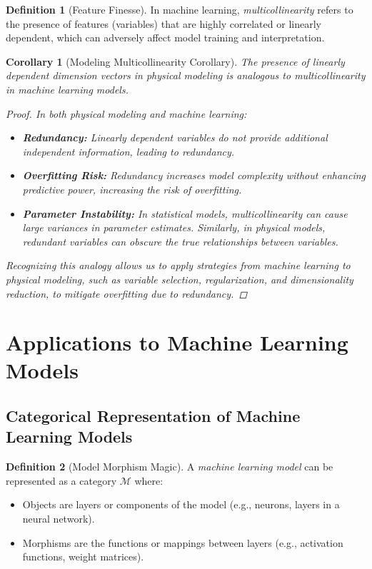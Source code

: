 \documentclass{article}
\newtheorem{corollary}{Corollary}[theorem]
\theoremstyle{definition}
\newtheorem{definition}{Definition}[section]
\theoremstyle{remark}
\begin{document}
	\begin{definition}[Feature Finesse]
		In machine learning, \emph{multicollinearity} refers to the presence of features (variables) that are highly correlated or linearly dependent, which can adversely affect model training and interpretation.
	\end{definition}
	
	\begin{corollary}[Modeling Multicollinearity Corollary]
		The presence of linearly dependent dimension vectors in physical modeling is analogous to multicollinearity in machine learning models.
		
		\begin{proof}
			In both physical modeling and machine learning:
			\begin{itemize}
				\item \textbf{Redundancy:} Linearly dependent variables do not provide additional independent information, leading to redundancy.
				\item \textbf{Overfitting Risk:} Redundancy increases model complexity without enhancing predictive power, increasing the risk of overfitting.
				\item \textbf{Parameter Instability:} In statistical models, multicollinearity can cause large variances in parameter estimates. Similarly, in physical models, redundant variables can obscure the true relationships between variables.
			\end{itemize}
			
			Recognizing this analogy allows us to apply strategies from machine learning to physical modeling, such as variable selection, regularization, and dimensionality reduction, to mitigate overfitting due to redundancy.
		\end{proof}
	\end{corollary}
	
	\section{Applications to Machine Learning Models}
	
	\subsection{Categorical Representation of Machine Learning Models}
	
	\begin{definition}[Model Morphism Magic]
		A \emph{machine learning model} can be represented as a category $\mathcal{M}$ where:
		\begin{itemize}
			\item Objects are layers or components of the model (e.g., neurons, layers in a neural network).
			\item Morphisms are the functions or mappings between layers (e.g., activation functions, weight matrices).
		\end{itemize}
	\end{definition}
	
\end{document}

